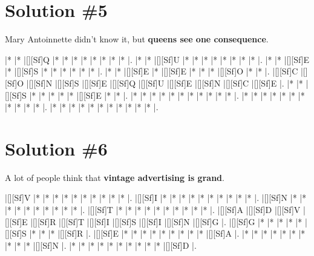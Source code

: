 \documentclass[letterpaper]{article}
\begin{document}
\newpage
\section*{Solution \#5}
Mary Antoinnette didn't know it, but \textbf{queens see one consequence}.

\vspace*{1em}
\begin{Puzzle}{11}{9}
|*        |*        |[][Sf]Q  |*        |*        |*        |*        |*        |*        |*        |*        |. 
|*        |*        |[][Sf]U  |*        |*        |*        |*        |*        |*        |*        |*        |.  
|*        |*        |[][Sf]E  |*        |[][Sf]S  |*        |*        |*        |*        |*        |*        |.
|*        |*        |[][Sf]E  |*        |[][Sf]E  |*        |*        |*        |[][Sf]O  |*        |*        |.  
|[][Sf]C  |[][Sf]O  |[][Sf]N  |[][Sf]S  |[][Sf]E  |[][Sf]Q  |[][Sf]U  |[][Sf]E  |[][Sf]N  |[][Sf]C  |[][Sf]E  |.
|*        |*        |[][Sf]S  |*        |*        |*        |*        |*        |[][Sf]E  |*        |*        |. 
|*        |*        |*        |*        |*        |*        |*        |*        |*        |*        |*        |.
|*        |*        |*        |*        |*        |*        |*        |*        |*        |*        |*        |.
|*        |*        |*        |*        |*        |*        |*        |*        |*        |*        |*        |.
\end{Puzzle}

\newpage
\section*{Solution \#6}
A lot of people think that \textbf{vintage advertising is grand}.

\vspace*{1em}
\begin{Puzzle}{11}{9}
|[][Sf]V  |*        |*        |*        |*        |*        |*        |*        |*        |*        |*        |. 
|[][Sf]I  |*        |*        |*        |*        |*        |*        |*        |*        |*        |*        |.  
|[][Sf]N  |*        |*        |*        |*        |*        |*        |*        |*        |*        |*        |.
|[][Sf]T  |*        |*        |*        |*        |*        |*        |*        |*        |*        |*        |.  
|[][Sf]A  |[][Sf]D  |[][Sf]V  |[][Sf]E  |[][Sf]R  |[][Sf]T  |[][Sf]I  |[][Sf]S  |[][Sf]I  |[][Sf]N  |[][Sf]G  |.
|[][Sf]G  |*        |*        |*        |*        |*        |[][Sf]S  |*        |*        |*        |[][Sf]R  |. 
|[][Sf]E  |*        |*        |*        |*        |*        |*        |*        |*        |*        |[][Sf]A  |.
|*        |*        |*        |*        |*        |*        |*        |*        |*        |*        |[][Sf]N  |.
|*        |*        |*        |*        |*        |*        |*        |*        |*        |*        |[][Sf]D  |.
\end{Puzzle}
\end{document}
